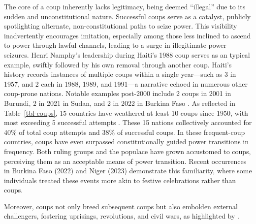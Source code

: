 \documentclass[
  12pt,
  a4paper,
  12pt]{article}
\begin{document}
The core of a coup inherently lacks legitimacy, being deemed ``illegal''
due to its sudden and unconstitutional nature. Successful coups serve as
a catalyst, publicly spotlighting alternate, non-constitutional paths to
seize power. This visibility inadvertently encourages imitation,
especially among those less inclined to ascend to power through lawful
channels, leading to a surge in illegitimate power seizures. Henri
Namphy's leadership during Haiti's 1988 coup serves as an typical
example, swiftly followed by his own removal through another coup.
Haiti's history records instances of multiple coups within a single
year---such as 3 in 1957, and 2 each in 1988, 1989, and 1991---a
narrative echoed in numerous other coup-prone nations. Notable examples
post-2000 include 2 coups in 2001 in Burundi, 2 in 2021 in Sudan, and 2
in 2022 in Burkina Faso \citep{powell2011}. As reflected in
Table~\ref{tbl-coups}, 15 countries have weathered at least 10 coups
since 1950, with most exceeding 5 successful attempts
\citep{powell2011}. These 15 nations collectively accounted for 40\% of
total coup attempts and 38\% of successful coups. In these frequent-coup
countries, coups have even surpassed constitutionally guided power
transitions in frequency. Both ruling groups and the populace have grown
accustomed to coups, perceiving them as an acceptable means of power
transition. Recent occurrences in Burkina Faso (2022) and Niger (2023)
demonstrate this familiarity, where some individuals treated these
events more akin to festive celebrations rather than coups.

Moreover, coups not only breed subsequent coups but also embolden
external challengers, fostering uprisings, revolutions, and civil wars,
as highlighted by \citet{dahl2023}.\\
\end{document}
